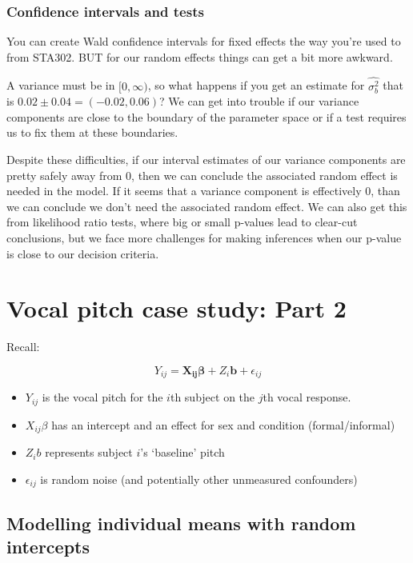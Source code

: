\documentclass[
  openany]{book}
\providecommand{\tightlist}{%
  \setlength{\itemsep}{0pt}\setlength{\parskip}{0pt}}
\begin{document}
\hypertarget{confidence-intervals-and-tests}{%
\subsubsection{Confidence intervals and tests}\label{confidence-intervals-and-tests}}

You can create Wald confidence intervals for fixed effects the way you're used to from STA302. BUT for our random effects things can get a bit more awkward.

A variance must be in \([0, \infty)\), so what happens if you get an estimate for \(\hat{\sigma_b^2}\) that is \(0.02 \pm 0.04 = (-0.02, 0.06)\)? We can get into trouble if our variance components are close to the boundary of the parameter space or if a test requires us to fix them at these boundaries.

Despite these difficulties, if our interval estimates of our variance components are pretty safely away from 0, then we can conclude the associated random effect is needed in the model. If it seems that a variance component is effectively 0, than we can conclude we don't need the associated random effect. We can also get this from likelihood ratio tests, where big or small p-values lead to clear-cut conclusions, but we face more challenges for making inferences when our p-value is close to our decision criteria.

\hypertarget{vocal-pitch-case-study-part-2}{%
\section{Vocal pitch case study: Part 2}\label{vocal-pitch-case-study-part-2}}

Recall:

\[Y_{ij} = \boldsymbol{X_{ij}\beta} + Z_{i}\boldsymbol{b} + \epsilon_{ij}\]

\begin{itemize}
\tightlist
\item
  \(Y_{ij}\) is the vocal pitch for the \(i\)th subject on the \(j\)th vocal response.
\item
  \(X_{ij}\beta\) has an intercept and an effect for sex and condition (formal/informal)
\item
  \(Z_ib\) represents subject \(i\)'s `baseline' pitch
\item
  \(\epsilon_{ij}\) is random noise (and potentially other unmeasured confounders)
\end{itemize}

\hypertarget{modelling-individual-means-with-random-intercepts}{%
\subsection{Modelling individual means with random intercepts}\label{modelling-individual-means-with-random-intercepts}}
\end{document}
